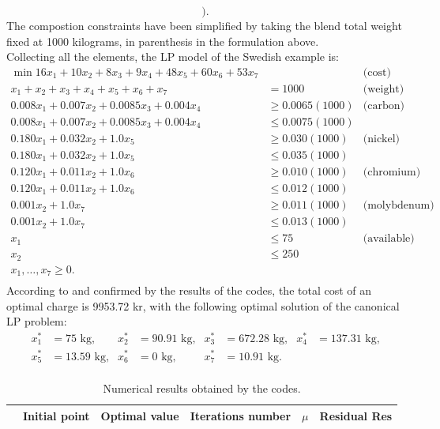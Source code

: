 \documentclass[a4paper,10 pt,titlepage,twoside]{report}
\theoremstyle{plain}
\theoremstyle{definition}
\theoremstyle{remark}
\begin{document}
{{\begin{equation*}
	\Bigg).
\end{equation*}		
The compostion constraints have been simplified by taking the blend total weight fixed at 1000 kilograms, in parenthesis in the formulation above.\\ Collecting all the elements, the LP model of the Swedish example is: 
\begin{align*}
\min16x_{1}+10x_{2}+8x_{3}+9x_{4}+48x_{5}+60x_{6}+53x_{7}& &\text{(cost)}&\\
x_{1}+x_{2}+x_{3}+x_{4}+x_{5}+x_{6} + x_{7}&= 1000&\text{(weight)}&\\
0.008x_{1}+0.007x_{2}+0.0085x_{3}+0.004x_{4}&\geq 0.0065(1000)&\text{(carbon)}&\\
0.008x_{1}+0.007x_{2} + 0.0085x_{3} + 0.004x_{4}&\leq 0.0075(1000)&\\
0.180x_{1}+0.032x_{2} + 1.0x_{5}&\geq 0.030(1000)& \text{(nickel)}&\\
0.180x_{1}+0.032x_{2} + 1.0x_{5}&\leq 0.035(1000)&\\
0.120x_{1}+0.011x_{2} + 1.0x_{6}&\geq 0.010(1000)& \text{(chromium)}&\\
0.120x_{1}+0.011x_{2} + 1.0x_{6}&\leq 0.012(1000)&\\
0.001x_{2} + 1.0x_{7}&\geq 0.011(1000)& \text{(molybdenum)}&\\
0.001x_{2} + 1.0x_{7}&\leq 0.013(1000)&\\
x_{1}&\leq 75&\text{(available)}&\\
x_{2}&\leq 250 &&\\
x_{1},\dots, x_{7}\geq 0.\\
\end{align*}
According to \cite{RR} and confirmed by the results of the codes, the total cost of an optimal charge is 9953.72 kr, with the following optimal solution of the canonical LP problem:
\begin{align*}
x_{1}^{*} &=  75\text{ kg,} & x_{2}^{*}&=  90.91\text{ kg,} & x_{3}^{*} &= 672.28 \text{ kg,} & x_{4}^{*} &= 137.31 \text{ kg,}\\
x_{5}^{*} &= 13.59 \text{ kg,}& x_{6}^{*}&= 0\text{ kg,}  & x_{7}^{*} &= 10.91 \text{ kg.} &&\\
\end{align*}
\begin{table}[t]\caption{\label{table:SWE}Numerical results obtained by the codes.}
	\begin{tabular}{cclcll}
		\hline		\textbf{} & \textbf{Initial point} & \multicolumn{1}{c}{\textbf{Optimal value}} & \textbf{Iterations number} & \multicolumn{1}{c}{\textbf{$\mu$}} & \multicolumn{1}{c}{\textbf{Residual} Res} \\ \hline

\end{tabular}
\end{table}}}
\end{document}

